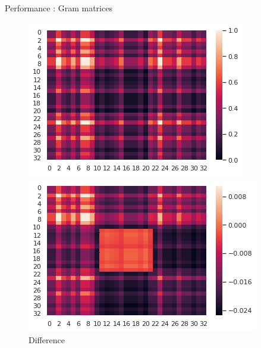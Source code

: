 \documentclass[compress]{beamer}
\begin{document}
\begin{frame}{Performance : Gram matrices}
\begin{figure}[!htb]
\begin{multicols}{3}
	\caption*{Raw Gram matrix}\par
	\includegraphics[width=\linewidth]{data/gram/gram4.png}
	\caption*{Fixed Point matrix}\par
	\includegraphics[width=\linewidth]{data/gram/gram5.png}
	\caption*{Difference}\par
	\end{multicols}
	\end{figure}
\end{frame}
\end{document}
